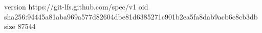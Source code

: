 version https://git-lfs.github.com/spec/v1
oid sha256:94445a81aba969a577d82604dbe81d6385271c901b2ea5fa8dab9acb6c8cb3db
size 87544
